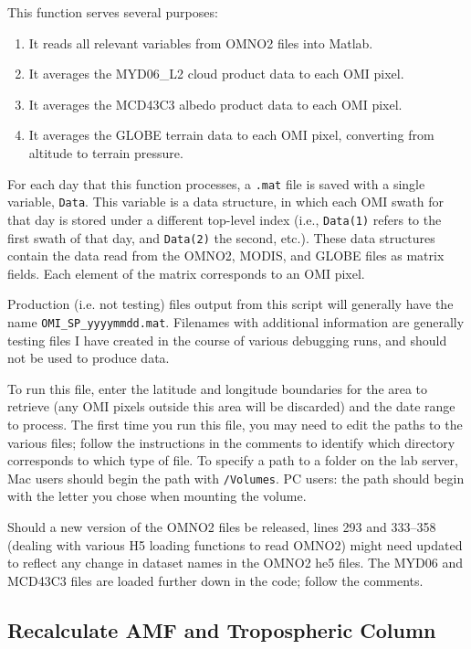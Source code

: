 \documentclass[12pt]{article}
\begin{document}
	 This function serves several purposes: 
		\begin{enumerate}
 		 \item It reads all relevant variables from OMNO2 files into Matlab.
		 \item It averages the MYD06\_L2 cloud product data to each OMI pixel.
		 \item It averages the MCD43C3 albedo product data to each OMI pixel.
		 \item It averages the GLOBE terrain data to each OMI pixel, converting from altitude to terrain pressure.
		\end{enumerate}
	For each day that this function processes, a \texttt{.mat} file is saved with a single variable, \texttt{Data}.  This variable is a data structure, in which each OMI swath for that day is stored under a different top-level index (i.e., \texttt{Data(1)} refers to the first swath of that day, and \texttt{Data(2)} the second, etc.).  These data structures contain the data read from the OMNO2, MODIS, and GLOBE files as matrix fields.  Each element of the matrix corresponds to an OMI pixel.
	
	Production (i.e. not testing) files output from this script will generally have the name \texttt{OMI\_SP\_yyyymmdd.mat}.  Filenames with additional information are generally testing files I have created in the course of various debugging runs, and should not be used to produce  data.
	
	To run this file, enter the latitude and longitude boundaries for the area to retrieve (any OMI pixels outside this area will be discarded) and the date range to process.  The first time you run this file, you may need to edit the paths to the various files; follow the instructions in the comments to identify which directory corresponds to which type of file.  To specify a path to a folder on the lab server, Mac users should begin the path with \texttt{/Volumes}.  PC users: the path should begin with the letter you chose when mounting the volume.
	
	Should a new version of the OMNO2 files be released, lines 293 and 333--358 (dealing with various H5 loading functions to read OMNO2) might need updated to reflect any change in dataset names in the OMNO2 he5 files.  The MYD06 and MCD43C3 files are loaded further down in the code; follow the comments. 
	
	\subsection{Recalculate AMF and Tropospheric Column}
	
\end{document}
